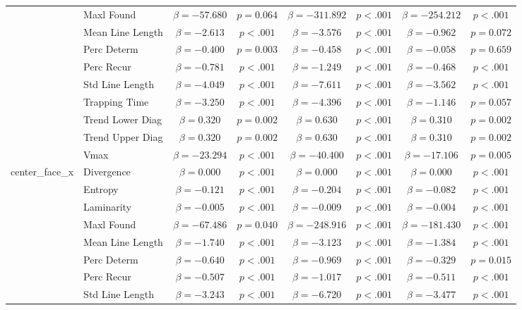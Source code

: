 \begin{tabular}{llcc|cc|cc}
 & Maxl Found & $\beta = -57.680$ & $p = 0.064$ & $\beta = -311.892$ & $p < .001$ & $\beta = -254.212$ & $p < .001$ \\
 & Mean Line Length & $\beta = -2.613$ & $p < .001$ & $\beta = -3.576$ & $p < .001$ & $\beta = -0.962$ & $p = 0.072$ \\
 & Perc Determ & $\beta = -0.400$ & $p = 0.003$ & $\beta = -0.458$ & $p < .001$ & $\beta = -0.058$ & $p = 0.659$ \\
 & Perc Recur & $\beta = -0.781$ & $p < .001$ & $\beta = -1.249$ & $p < .001$ & $\beta = -0.468$ & $p < .001$ \\
 & Std Line Length & $\beta = -4.049$ & $p < .001$ & $\beta = -7.611$ & $p < .001$ & $\beta = -3.562$ & $p < .001$ \\
 & Trapping Time & $\beta = -3.250$ & $p < .001$ & $\beta = -4.396$ & $p < .001$ & $\beta = -1.146$ & $p = 0.057$ \\
 & Trend Lower Diag & $\beta = 0.320$ & $p = 0.002$ & $\beta = 0.630$ & $p < .001$ & $\beta = 0.310$ & $p = 0.002$ \\
 & Trend Upper Diag & $\beta = 0.320$ & $p = 0.002$ & $\beta = 0.630$ & $p < .001$ & $\beta = 0.310$ & $p = 0.002$ \\
 & Vmax & $\beta = -23.294$ & $p < .001$ & $\beta = -40.400$ & $p < .001$ & $\beta = -17.106$ & $p = 0.005$ \\
\midrule
\multirow{12}{*}{center_face_x} & Divergence & $\beta = 0.000$ & $p < .001$ & $\beta = 0.000$ & $p < .001$ & $\beta = 0.000$ & $p < .001$ \\
 & Entropy & $\beta = -0.121$ & $p < .001$ & $\beta = -0.204$ & $p < .001$ & $\beta = -0.082$ & $p < .001$ \\
 & Laminarity & $\beta = -0.005$ & $p < .001$ & $\beta = -0.009$ & $p < .001$ & $\beta = -0.004$ & $p < .001$ \\
 & Maxl Found & $\beta = -67.486$ & $p = 0.040$ & $\beta = -248.916$ & $p < .001$ & $\beta = -181.430$ & $p < .001$ \\
 & Mean Line Length & $\beta = -1.740$ & $p < .001$ & $\beta = -3.123$ & $p < .001$ & $\beta = -1.384$ & $p < .001$ \\
 & Perc Determ & $\beta = -0.640$ & $p < .001$ & $\beta = -0.969$ & $p < .001$ & $\beta = -0.329$ & $p = 0.015$ \\
 & Perc Recur & $\beta = -0.507$ & $p < .001$ & $\beta = -1.017$ & $p < .001$ & $\beta = -0.511$ & $p < .001$ \\
 & Std Line Length & $\beta = -3.243$ & $p < .001$ & $\beta = -6.720$ & $p < .001$ & $\beta = -3.477$ & $p < .001$ \\

\end{tabular}
